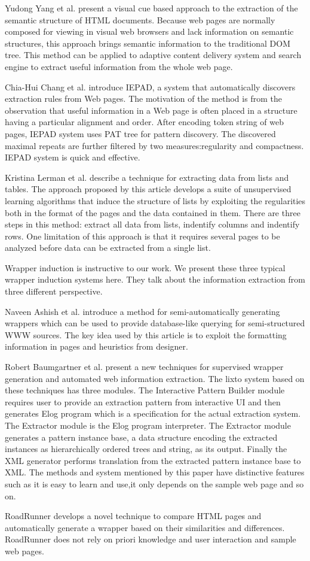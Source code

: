 Yudong Yang et al. \cite{YangZ01:VisualCues} present a visual cue based approach to the extraction of the semantic structure of HTML documents.
Because web pages are normally composed for viewing in visual web browsers and lack information on semantic structures, this approach brings semantic information to the traditional DOM tree.
This method can be applied to adaptive content delivery system and search engine to extract useful information from the whole web page.

Chia-Hui Chang et al. \cite{ChangL01:IEPAD} introduce IEPAD, a system that automatically discovers extraction rules from Web pages. The motivation of the method is from the observation that useful information in a Web page is often placed in a structure having a particular alignment and order. After encoding token string of web pages, IEPAD system uses PAT tree for pattern discovery. The discovered maximal repeats are further filtered by two measures:regularity and compactness. IEPAD system is quick and effective.

Kristina Lerman et al.\cite{Lerman01:AutomaticData} describe a technique for extracting data from lists and tables. The approach proposed by this article develops a suite of unsupervised learning algorithms that induce the structure of lists by exploiting the regularities both in the format of the pages and the data contained in them. There are three steps in this method: extract all data from lists, indentify columns and indentify rows. One limitation of this approach is that it requires several pages to be analyzed before data can be extracted from a single list.

Wrapper induction \cite{AshishK97:WrapperGeneration,BaumgartnerFG01:Lixto,MeccaCM01:RoadRunner} is instructive to our work. We present these three typical wrapper induction systems here. They talk about the information extraction from three different perspective.

Naveen Ashish et al. \cite{AshishK97:WrapperGeneration} introduce a method for semi-automatically generating wrappers which can be used to provide database-like querying for semi-structured WWW sources. The key idea used by this article is to exploit the formatting information in pages and heuristics from designer.

Robert Baumgartner et al.\cite{BaumgartnerFG01:Lixto} present a new techniques for supervised wrapper generation and automated web information extraction.
The lixto system based on these techniques has three modules. The Interactive Pattern Builder module requires user to provide an extraction pattern from interactive UI and then generates Elog program which is a specification for the actual extraction system.
The Extractor module is the Elog program interpreter. The Extractor module generates a pattern instance base, a data structure encoding the extracted instances as hierarchically ordered trees and string, as its output. Finally the XML generator performs translation from the extracted pattern instance base to XML. The methods and system mentioned by this paper have distinctive features such as it is easy to learn and use,it only depends on the sample web page and so on.

RoadRunner \cite{MeccaCM01:RoadRunner} develops a novel technique to compare HTML pages and automatically generate a wrapper based on their similarities and differences. RoadRunner does not rely on priori knowledge and user interaction and sample web pages.

 